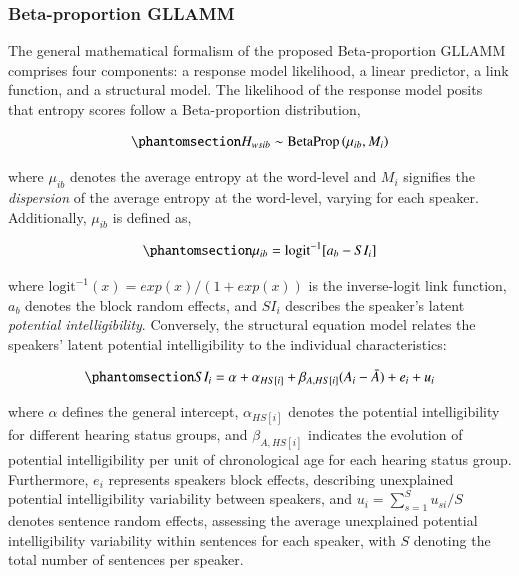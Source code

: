 \documentclass[
  authoryear,
  preprint,
  1p]{elsarticle}
\begin{document}
\subsubsection{Beta-proportion GLLAMM}\label{sec-M-SM-BGLLAMM}

The general mathematical formalism of the proposed Beta-proportion
GLLAMM comprises four components: a response model likelihood, a linear
predictor, a link function, and a structural model. The likelihood of
the response model posits that entropy scores follow a Beta-proportion
distribution,

\begin{equation}\phantomsection\label{eq-beta-GLLAMM-likelihood}{
H_{wsib} \sim \text{BetaProp} \left( \mu_{ib}, M_{i} \right)
}\end{equation}

where \(\mu_{ib}\) denotes the average entropy at the word-level and
\(M_{i}\) signifies the \emph{dispersion} of the average entropy at the
word-level, varying for each speaker. Additionally, \(\mu_{ib}\) is
defined as,

\begin{equation}\phantomsection\label{eq-beta-GLLAMM-linpred}{
\mu_{ib} = \text{logit}^{-1}[ a_{b} - SI_{i} ]
}\end{equation}

where \(\text{logit}^{-1}(x) = exp(x) / (1+exp(x))\) is the
inverse-logit link function, \(a_{b}\) denotes the block random effects,
and \(SI_{i}\) describes the speaker's latent \emph{potential
intelligibility}. Conversely, the structural equation model relates the
speakers' latent potential intelligibility to the individual
characteristics:

\begin{equation}\phantomsection\label{eq-beta-GLLAMM-structural}{
SI_{i} = \alpha + \alpha_{HS[i]} + \beta_{A, HS[i]} (A_{i} - \bar{A}) + e_{i} + u_{i}
}\end{equation}

where \(\alpha\) defines the general intercept, \(\alpha_{HS[i]}\)
denotes the potential intelligibility for different hearing status
groups, and \(\beta_{A,HS[i]}\) indicates the evolution of potential
intelligibility per unit of chronological age for each hearing status
group. Furthermore, \(e_{i}\) represents speakers block effects,
describing unexplained potential intelligibility variability between
speakers, and \(u_{i} = \sum_{s=1}^{S} u_{si}/S\) denotes sentence
random effects, assessing the average unexplained potential
intelligibility variability within sentences for each speaker, with
\(S\) denoting the total number of sentences per speaker.
\end{document}
